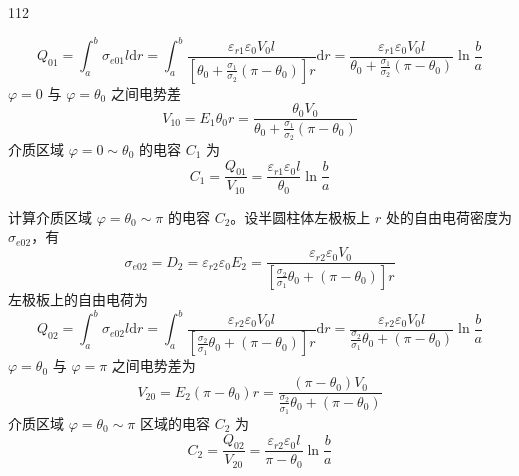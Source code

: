 \begin{solution}{112}
\begin{subsolution}
\begin{equation}
            Q_{01} = \int_{a}^{b} \sigma_{e01} l \mathrm{d} r = \int_{a}^{b} \frac{\varepsilon_{r1} \varepsilon_{0} V_{0} l}{\left[ \theta_{0} + \frac{\sigma_{1}}{\sigma_{2}} (\pi - \theta_{0}) \right] r} \mathrm{d} r = \frac{\varepsilon_{r1} \varepsilon_{0} V_{0} l}{\theta_{0} + \frac{\sigma_{1}}{\sigma_{2}} (\pi - \theta_{0})} \ln \frac{b}{a}
            \label{eq:10.s112}
        \end{equation}
        $\varphi=0$ 与 $\varphi=\theta_{0}$ 之间电势差
        \begin{equation}
            V_{10} = E_{1} \theta_{0} r = \frac{\theta_{0} V_{0}}{\theta_{0} + \frac{\sigma_{1}}{\sigma_{2}} (\pi - \theta_{0})}
            \label{eq:11.s112}
        \end{equation}
        介质区域 $\varphi = 0\sim \theta_0$ 的电容 $C_1$ 为
        \begin{equation}
            C_{1} = \frac{Q_{01}}{V_{10}} = \frac{\varepsilon_{r1} \varepsilon_{0} l}{\theta_{0}} \ln \frac{b}{a}
            \label{eq:12.s112}
        \end{equation}

        计算介质区域 $\varphi = \theta_{0} \sim \pi$ 的电容 $C_{2}$。设半圆柱体左极板上 $r$ 处的自由电荷密度为 $\sigma_{e02}$，有
        \begin{equation}
            \sigma_{e02} = D_{2} = \varepsilon_{r2} \varepsilon_{0} E_{2} = \frac{\varepsilon_{r2} \varepsilon_{0} V_{0}}{\left[ \frac{\sigma_{2}}{\sigma_{1}} \theta_{0} + (\pi - \theta_{0}) \right] r}
            \label{eq:13.s112}
        \end{equation}
        左极板上的自由电荷为
        \begin{equation}
            Q_{02} = \int_{a}^{b} \sigma_{e02} l \mathrm{d} r = \int_{a}^{b} \frac{\varepsilon_{r2} \varepsilon_{0} V_{0} l}{\left[ \frac{\sigma_{2}}{\sigma_{1}} \theta_{0} + (\pi - \theta_{0}) \right] r} \mathrm{d} r = \frac{\varepsilon_{r2} \varepsilon_{0} V_{0} l}{\frac{\sigma_{2}}{\sigma_{1}} \theta_{0} + (\pi - \theta_{0})} \ln \frac{b}{a}
            \label{eq:14.s112}
        \end{equation}
        $\varphi=\theta_{0}$ 与 $\varphi=\pi$ 之间电势差为
        \begin{equation}
            V_{20} = E_{2} \left(\pi - \theta_{0}\right) r = \frac{\left(\pi - \theta_{0}\right) V_{0}}{\frac{\sigma_{2}}{\sigma_{1}} \theta_{0} + \left(\pi - \theta_{0}\right)}
            \label{eq:15.s112}
        \end{equation}
        介质区域 $\varphi = \theta_{0} \sim \pi$ 区域的电容 $C_{2}$ 为
        \begin{equation}
            C_{2} = \frac{Q_{02}}{V_{20}} = \frac{\varepsilon_{r2} \varepsilon_{0} l}{\pi - \theta_{0}} \ln \frac{b}{a}
            \label{eq:16.s112}
        \end{equation}


\end{subsolution}
\end{solution}

